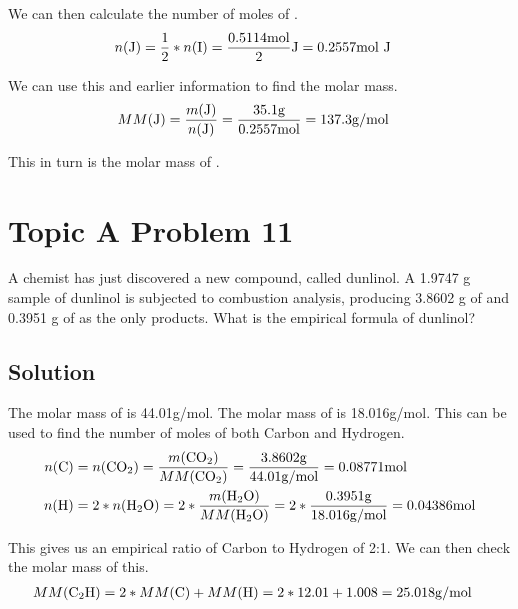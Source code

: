 \documentclass[10pt]{article}
\begin{document}
            We can then calculate the number of moles of .
            \begin{align}
                n(\ce{J})   &=  \frac{1}{2} * n(\ce{I})
                    =   \frac{0.5114\unit{\mole}}{2} \ce{J}
                    =   0.2557 \unit{\mole}\ \ce{J}
            \end{align}

            We can use this and earlier information to find the molar mass.
            \begin{align}
                MM(\ce{J})  &=  \frac{m(\ce{J})}{n(\ce{J})}
                    =   \frac{35.1 \unit{\gram}}{0.2557 \unit{\mole}}
                    =   137.3 \unit{\gram/\mole}
            \end{align}

            This in turn is the molar mass of .

    \pagebreak
    \section{Topic A Problem 11}
        A chemist has just discovered a new compound, called dunlinol. 
        A 1.9747 g sample of dunlinol is subjected to combustion analysis, producing 3.8602 g of  and 0.3951 g of  as the only products. 
        What is the empirical formula of dunlinol?

        \subsection{Solution}
            The molar mass of  is 44.01\unit{\gram/\mole}. 
            The molar mass of  is 18.016\unit{\gram/\mole}.
            This can be used to find the number of moles of both Carbon and Hydrogen.
            \begin{align}
                n(\ce{C})   &=  n(\ce{CO2})
                    =   \frac{m(\ce{CO2})}{MM(\ce{CO2})}
                    =   \frac{3.8602 \unit{\gram}}{44.01 \unit{\gram/\mole}}
                    =   0.08771 \unit{\mole}\\
                n(\ce{H})   &=  2 * n(\ce{H2O})
                    =   2 * \frac{m(\ce{H2O})}{MM(\ce{H2O})}
                    =   2 * \frac{0.3951 \unit{\gram}}{18.016 \unit{\gram/\mole}}
                    =   0.04386 \unit{\mole}
            \end{align}

            This gives us an empirical ratio of Carbon to Hydrogen of 2:1.
            We can then check the molar mass of this.
            \begin{align}
                MM(\ce{C2H})    &=  2 * MM(\ce{C}) + MM(\ce{H})
                    =   2 * 12.01 + 1.008
                    =   25.018 \unit{\gram/\mole}
            \end{align}
\end{document}
